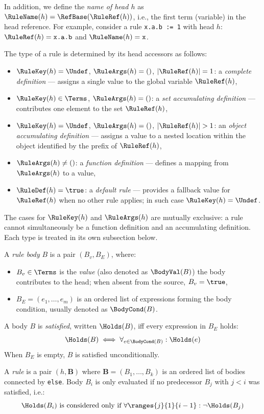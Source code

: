 In addition, we define the \emph{name of head $h$} as $\RuleName(h) = \RefBase(\RuleRef(h))$, i.e., the first term (variable) in the head reference.
For example, consider a rule \texttt{x.a.b := 1} with head $h$: $\RuleRef(h) = \texttt{x.a.b}$ and $\RuleName(h) = \texttt{x}$.

The type of a rule is determined by its head accessors as follows:
\begin{itemize}
  \item $\RuleKey(h) = \Undef$, $\RuleArgs(h) = ()$, $|\RuleRef(h)| = 1$:
        a \emph{complete definition} — assigns a single value to the global variable $\RuleRef(h)$,
  \item $\RuleKey(h) \in \Terms$, $\RuleArgs(h) = ()$:
        a \emph{set accumulating definition} — contributes one element to the set $\RuleRef(h)$,
  \item $\RuleKey(h) = \Undef$, $\RuleArgs(h) = ()$, $|\RuleRef(h)| > 1$:
        an \emph{object accumulating definition} — assigns a value to a nested location within the object identified by the prefix of $\RuleRef(h)$,
  \item $\RuleArgs(h) \neq ()$: a \emph{function definition} — defines a mapping from $\RuleArgs(h)$ to a value,
  \item $\RuleDef(h) = \true$: a \emph{default rule} — provides a fallback value for $\RuleRef(h)$ when no other rule applies; in such case $\RuleKey(h) = \Undef$.
\end{itemize}
The cases for $\RuleKey(h)$ and $\RuleArgs(h)$ are mutually exclusive: a rule cannot simultaneously be a function definition and an accumulating definition.
Each type is treated in its own subsection below.

A \emph{rule body} $B$ is a pair $(B_v, B_E)$, where:
\begin{itemize}
  \item $B_v \in \Terms$ is the \emph{value} (also denoted as $\BodyVal(B)$) the body contributes to the head; when absent from the source, $B_v = \true$,
  \item $B_E = (e_1, \ldots, e_m)$ is an ordered list of expressions forming the body condition, usually denoted as $\BodyCond(B)$.
\end{itemize}

A body $B$ is \emph{satisfied}, written $\Holds(B)$, iff every expression in $B_E$ holds:
$$\Holds(B) \iff \forall_{e \in \BodyCond(B)} : \Holds(e)$$
When $B_E$ is empty, $B$ is satisfied unconditionally.

A \emph{rule} is a pair $(h, \mathbf{B})$ where $\mathbf{B} = (B_1, \ldots, B_k)$ is an ordered list of bodies connected by \texttt{else}.
Body $B_i$ is only evaluated if no predecessor $B_j$ with $j < i$ was satisfied, i.e.:
$$\Holds(B_i) \text{ is considered only if } \forall \ranges{j}{1}{i-1} : \neg\Holds(B_j)$$

